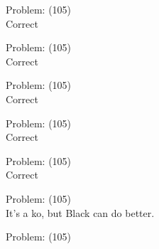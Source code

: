 \documentclass[11pt]{article}
\begin{document}
\begin{minipage}[t]{0.5\textwidth}
  {\centering
  
  Problem: (105)\\
  Correct\\
  }
\end{minipage}
\begin{minipage}[t]{0.5\textwidth}
  {\centering
  
  Problem: (105)\\
  Correct\\
  }
\end{minipage}
\begin{minipage}[t]{0.5\textwidth}
  {\centering
  
  Problem: (105)\\
  Correct\\
  }
\end{minipage}
\begin{minipage}[t]{0.5\textwidth}
  {\centering
  
  Problem: (105)\\
  Correct\\
  }
\end{minipage}
\begin{minipage}[t]{0.5\textwidth}
  {\centering
  
  Problem: (105)\\
  Correct\\
  }
\end{minipage}
\begin{minipage}[t]{0.5\textwidth}
  {\centering
  
  Problem: (105)\\
  It's a ko, but Black can do better.\\
  }
\end{minipage}
\begin{minipage}[t]{0.5\textwidth}
  {\centering
  
  Problem: (105)\\
  
  }
\end{minipage}
\end{document}
